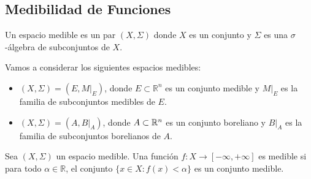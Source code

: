 \subsection{Medibilidad de Funciones}

\begin{definición}
Un espacio medible es un par $(X, \Sigma)$ donde $X$ es un conjunto y $\Sigma$ es una $\sigma$-álgebra de subconjuntos de $X$.
\end{definición}
Vamos a considerar los siguientes espacios medibles:

\begin{itemize}
    \item $(X, \Sigma) = (E, M|_E)$, donde $E \subset \mathbb{R}^n$ es un conjunto medible y $M|_E$ es la familia de subconjuntos medibles de $E$.
    \item $(X, \Sigma) = (A, B|_A)$, donde $A \subset \mathbb{R}^n$ es un conjunto boreliano y $B|_A$ es la familia de subconjuntos borelianos de $A$.
\end{itemize}

\begin{definición}
Sea $(X, \Sigma)$ un espacio medible. Una función $f: X \to [-\infty, +\infty]$ es medible si para todo $\alpha \in \mathbb{R}$, el conjunto $\{x \in X : f(x) < \alpha\}$ es un conjunto medible.
\end{definición}


